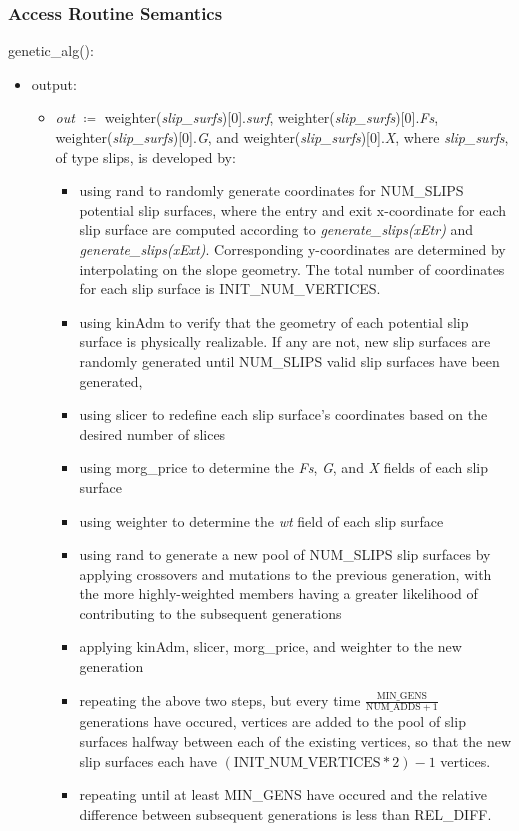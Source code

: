 \documentclass[12pt, titlepage]{article}
\begin{document}
\subsubsection{Access Routine Semantics}
genetic\_alg():
\begin{itemize}
	\item output:
	\begin{itemize}
	\item[] \textit{out} $\coloneqq$ 
	weighter(\textit{slip\_surfs})[0].\textit{surf}, 
	weighter(\textit{slip\_surfs})[0].\textit{Fs}, 
	weighter(\textit{slip\_surfs})[0].\textit{G}, 
	and weighter(\textit{slip\_surfs})[0].\textit{X}, where 
	\textit{slip\_surfs}, of 
	type slips, is developed by:
	\begin{itemize}
		\item using rand to randomly generate coordinates for NUM\_SLIPS 
		potential slip surfaces, where the entry and exit x-coordinate for each 
		slip surface are computed according to \textit{generate\_slips(xEtr)} 
		and \textit{generate\_slips(xExt)}. Corresponding y-coordinates are 
		determined by interpolating on the slope geometry. The total number of 
		coordinates for each slip surface is INIT\_NUM\_VERTICES.
		\item using kinAdm to verify that the geometry of each potential slip 
		surface is physically realizable. If any are not, new slip surfaces are 
		randomly generated until NUM\_SLIPS valid slip surfaces have been 
		generated,
		\item using slicer to redefine each slip surface's coordinates based on 
		the desired number of slices
		\item using morg\_price to determine the \textit{Fs}, \textit{G}, and 
		\textit{X} fields of each slip 
		surface
		\item using weighter to determine the \textit{wt} field of each 
		slip surface
		\item using rand to generate a new pool of NUM\_SLIPS slip surfaces by 
		applying crossovers and mutations to the previous generation, with the 
		more highly-weighted members having a greater likelihood of 
		contributing to the subsequent generations
		\item applying kinAdm, slicer, morg\_price, and weighter to the new 
		generation
		\item repeating the above two steps, but every time 
		$\frac{\text{MIN\_GENS}}{\text{NUM\_ADDS}+1}$ generations have occured, 
		vertices are added to the pool of slip surfaces halfway between each of 
		the existing vertices, so that the new slip surfaces each have 
		$(\text{INIT\_NUM\_VERTICES} * 2) - 1$ vertices. 
		\item repeating until at least MIN\_GENS have occured and the relative 
		difference between subsequent generations is less than REL\_DIFF.
	\end{itemize}
	\end{itemize}
\end{itemize}
\end{document}
